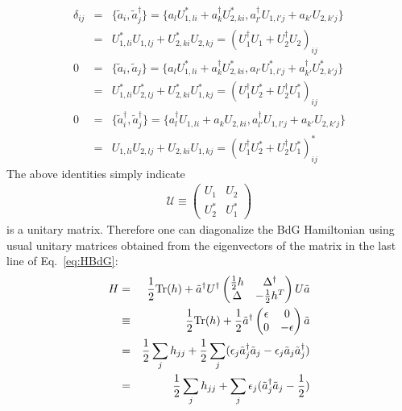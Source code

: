 \begin{eqnarray}
	\delta_{ij} &=& \{\tilde{a}_{i}, \tilde{a}_j^\dag \} = \{a_{l} U^*_{1,li} + a^\dag_{k} U^*_{2,ki},  a_{l'}^\dag U_{1,l'j} + a_{k'} U_{2,k'j}  \} \\\nonumber
	&=&  U^*_{1,li} U_{1,lj} + U^*_{2,ki}U_{2,kj} = (U_1^\dag U_1 + U_2^\dag U_2)_{ij} \\\nonumber
	0 &=& \{\tilde{a}_{i}, \tilde{a}_j \} =\{a_{l} U^*_{1,li} + a^\dag_{k} U^*_{2,ki}, a_{l'} U^*_{1,l'j} + a^\dag_{k'} U^*_{2,k'j}  \} \\\nonumber
	&=& U^*_{1,li}U^*_{2,lj} + U^*_{2,ki}U^*_{1,kj} = (U^\dag_1 U_2^* + U^\dag_2 U_1^*)_{ij}\\\nonumber
	0 &=& \{\tilde{a}_{i}^\dag, \tilde{a}_j^\dag \} =\{a_{l}^\dag U_{1,li} + a_{k} U_{2,ki}, a^\dag_{l'} U_{1,l'j} + a_{k'} U_{2,k'j}  \} \\\nonumber
      &=& U_{1,li}U_{2,lj} + U_{2,ki}U_{1,kj} = (U^\dag_1 U_2^* + U^\dag_2 U_1^*)^*_{ij}
\end{eqnarray}
The above identities simply indicate
\begin{eqnarray}
\mathcal{U} \equiv \begin{pmatrix}
		U_1 & U_2 \\
		U_2^* & U_1^*
	\end{pmatrix}
\end{eqnarray}
is a unitary matrix. Therefore one can diagonalize the BdG Hamiltonian using usual unitary matrices obtained from the eigenvectors of the matrix in the last line of Eq.~\ref{eq:HBdG}:
\begin{eqnarray}\label{eq:HBdGdiag}
	H &=& \frac{1}{2}{\rm Tr}(h) + \tilde{a}^\dag U^\dag \begin{pmatrix}
		\frac{1}{2} h & \Delta^\dag \\
		\Delta & -\frac{1}{2}h^T
	\end{pmatrix} U \tilde{a}\\\nonumber
&\equiv& \frac{1}{2}{\rm Tr}(h) + \frac{1}{2}\tilde{a}^\dag \begin{pmatrix}
	\epsilon & 0 \\
	0 & -\epsilon
\end{pmatrix} \tilde{a}\\\nonumber
&=& \frac{1}{2}\sum_{j}h_{jj} +\frac{1}{2} \sum_{j}(\epsilon_j \tilde{a}_j^\dag \tilde{a}_j - \epsilon_j \tilde{a}_j \tilde{a}_j^\dag) \\\nonumber
&=&  \frac{1}{2}\sum_{j}h_{jj} +\sum_{j}\epsilon_j(\tilde{a}_j^\dag \tilde{a}_j - \frac{1}{2})
\end{eqnarray}
